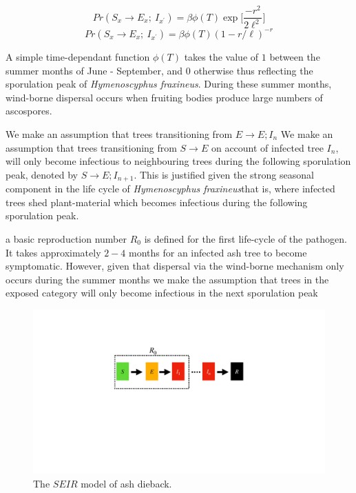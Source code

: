 \begin{equation}
    Pr(S_{x} \rightarrow E_{x} ;\ I_{x^{\prime}} ) = \beta  \phi(T) \exp\Big[\frac{-r^2}{2\ell^2}\Big] 
\end{equation}
\begin{equation}
    Pr(S_{x} \rightarrow E_{x} ;\ I_{x^{\prime}} ) = \beta \phi(T) (1 - r/\ell)^{-r}
\end{equation}

A simple time-dependant function $\phi(T)$ takes the value of $1$ between the summer months of June - September, and $0$ otherwise thus reflecting the sporulation peak of \textit{Hymenoscyphus fraxineus}. During these summer months, wind-borne dispersal occurs when fruiting bodies produce large numbers of ascospores. 

We make an assumption that trees transitioning from $E\rightarrow E; I_{n}$
We make an assumption that trees transitioning from $S\rightarrow E$ on account of infected tree $I_{n}$, will only become infectious to neighbouring trees during the following sporulation peak, denoted by $S\rightarrow E; I_{n+1}$. This is justified given the strong seasonal component in the life cycle of \textit{Hymenoscyphus fraxineus}\textemdash that is, where infected trees shed plant-material which 
becomes infectious during the following sporulation peak. 

a basic reproduction number $R_0$ is defined for the first life-cycle of the pathogen.
It takes approximately $2-4$ months for an infected ash tree to become symptomatic. However, given that dispersal via the wind-borne mechanism only occurs during the summer months we make the assumption that trees in the exposed category will only become infectious in the next sporulation peak





\begin{figure}
    \centering
    \includegraphics[scale=0.30]{chapter5/figures_/fig4.pdf}
    \caption{The $SEIR$ model of ash dieback.}
    \label{fig:my_label}
\end{figure}

